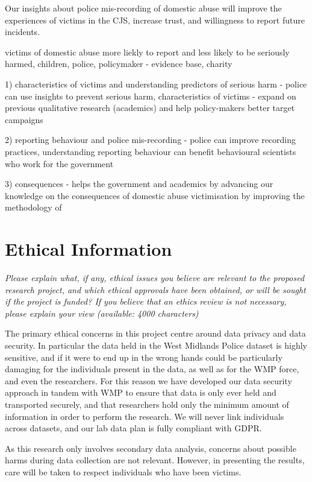 \documentclass[11pt, a4paper]{article}
\begin{document}
Our insights about police mis-recording of domestic abuse will improve the experiences of victims in the CJS, increase trust, and willingness to report future incidents.






victims of domestic abuse more liekly to report and less likely to be seriously harmed, children, police, policymaker - evidence base, charity

1) characteristics of victims and understanding predictors of serious harm - police can use insights to prevent serious harm, characteristics of victims - expand on previous qualitative research (academics) and help policy-makers better target campaigns

2) reporting behaviour and police mis-recording - police can improve recording practices, understanding reporting behaviour can benefit behavioural scientists who work for the government

3) consequences - helps the government and academics by advancing our knowledge on the consequences of domestic abuse victimisation by improving the methodology of
  
  
  

\section{Ethical Information}

\textit{Please explain what, if any, ethical issues you believe are relevant to the proposed research project, and which ethical approvals have been obtained, or will be sought if the project is funded? If you believe that an ethics review is not necessary, please explain your view (available: 4000 characters)}

The primary ethical concerns in this project centre around data privacy and data security. In particular the data held in the West Midlands Police dataset is highly sensitive, and if it were to end up in the wrong hands could be particularly damaging for the individuals present in the data, as well as for the WMP force, and even the researchers. For this reason we have developed our data security approach in tandem with WMP to ensure that data is only ever held and transported securely, and that researchers hold only the minimum amount of information in order to perform the research. We will never link individuals across datasets, and our lab data plan is fully compliant with GDPR.

As this research only involves secondary data analysis, concerns about possible harms during data collection are not relevant. However, in presenting the results, care will be taken to respect individuals who have been victims.
\end{document}
